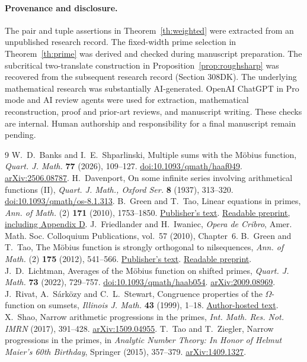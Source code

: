 \documentclass[11pt]{article}
\begin{document}
\paragraph{Provenance and disclosure.}
The pair and tuple assertions in Theorem~\ref{th:weighted} were extracted
from an unpublished research record. The fixed-width prime selection in
Theorem~\ref{th:prime} was derived and checked during manuscript preparation.
The subcritical two-translate construction in Proposition~\ref{prop:roughsharp}
was recovered from the subsequent research record (Section 308DK).
The underlying mathematical research was substantially AI-generated.
OpenAI ChatGPT in Pro mode and AI review agents were used for extraction,
mathematical reconstruction, proof and prior-art reviews, and manuscript
writing. These checks are internal. Human authorship and responsibility for a final
manuscript remain pending.

\begin{thebibliography}{9}\small
{} W.\ D.\ Banks and I.\ E.\ Shparlinski,
Multiple sums with the M\"obius function, \emph{Quart. J. Math.}
\textbf{77} (2026), 109--127. \href{https://doi.org/10.1093/qmath/haaf049}{doi:10.1093/qmath/haaf049}.
\href{https://arxiv.org/abs/2506.08787}{arXiv:2506.08787}.
 H.\ Davenport, On some infinite series involving arithmetical
functions (II), \emph{Quart. J. Math., Oxford Ser.} \textbf{8} (1937), 313--320.
\href{https://doi.org/10.1093/qmath/os-8.1.313}{doi:10.1093/qmath/os-8.1.313}.
 B.\ Green and T.\ Tao, Linear equations in primes,
\emph{Ann. of Math.} (2) \textbf{171} (2010), 1753--1850.
\href{https://annals.math.princeton.edu/2010/171-3/p08}{Publisher's text}.
\href{https://arxiv.org/html/math/0606088}{Readable preprint, including Appendix D}.
 J.\ Friedlander and H.\ Iwaniec, \emph{Opera de Cribro},
Amer. Math. Soc. Colloquium Publications, vol.~57 (2010), Chapter~6.
 B.\ Green and T.\ Tao, The M\"obius function is strongly
orthogonal to nilsequences, \emph{Ann. of Math.} (2) \textbf{175} (2012),
541--566. \href{https://annals.math.princeton.edu/2012/175-2/p03}{Publisher's text}.
\href{https://arxiv.org/html/0807.1736}{Readable preprint}.
 J.\ D.\ Lichtman, Averages of the M\"obius function on
shifted primes, \emph{Quart. J. Math.} \textbf{73} (2022), 729--757.
\href{https://doi.org/10.1093/qmath/haab054}{doi:10.1093/qmath/haab054}.
\href{https://arxiv.org/abs/2009.08969}{arXiv:2009.08969}.
 J.\ Rivat, A.\ S\'ark\"ozy and C.\ L.\ Stewart, Congruence
properties of the \(\Omega\)-function on sumsets, \emph{Illinois J. Math.}
\textbf{43} (1999), 1--18.
\href{https://uwaterloo.ca/pure-mathematics/sites/default/files/uploads/documents/1255985334.pdf}{Author-hosted text}.
 X.\ Shao, Narrow arithmetic progressions in the primes,
\emph{Int. Math. Res. Not. IMRN} (2017), 391--428.
\href{https://arxiv.org/abs/1509.04955}{arXiv:1509.04955}.
 T.\ Tao and T.\ Ziegler, Narrow progressions in the primes,
in \emph{Analytic Number Theory: In Honor of Helmut Maier's 60th Birthday},
Springer (2015), 357--379.
\href{https://arxiv.org/abs/1409.1327}{arXiv:1409.1327}.
\end{thebibliography}
\end{document}
